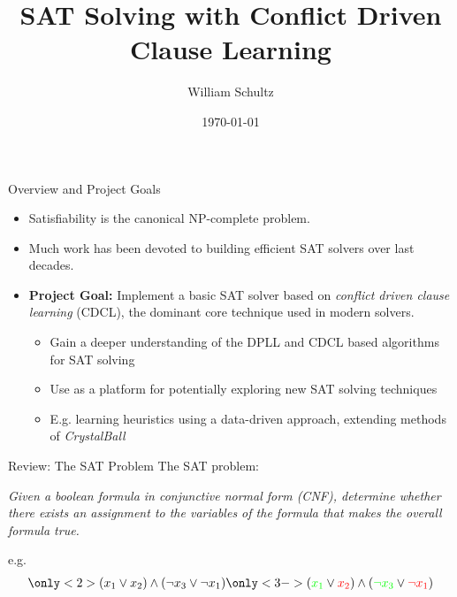 \documentclass{beamer}
\title{SAT Solving with Conflict Driven Clause Learning}
\author{William Schultz}
\institute{CS 7240 Final Project}
\date{\today}
\begin{document}
\newcommand{\green}[1]{\textcolor{green}{#1}}
\newcommand{\red}[1]{\textcolor{red}{#1}}

\begin{frame}
    \titlepage
\end{frame}

\begin{frame}{Overview and Project Goals}
\begin{itemize}
    \item Satisfiability is the canonical NP-complete problem.
    
    \item Much work has been devoted to building efficient SAT solvers over last decades.\\
    
    \item \textbf{Project Goal:} Implement a basic SAT solver based on \textit{conflict driven clause learning} (CDCL), the dominant core technique used in modern solvers.
    \begin{itemize}
        \item Gain a deeper understanding of the DPLL and CDCL based algorithms for SAT solving
        \item Use as a platform for potentially exploring new SAT solving techniques 
        \item E.g. learning heuristics using a data-driven approach, extending methods of \textit{CrystalBall} \cite{2019sooscrystalball}
    \end{itemize}
\end{itemize}
\end{frame}

\begin{frame}{Review: The SAT Problem}
    The SAT problem:
    \vspace{12pt}

    \textit{Given a boolean formula in conjunctive normal form (CNF), determine whether there exists an assignment to the variables of the formula that makes the overall formula true.}

    \pause
    \vspace{12pt}
    e.g.
    \begin{align*}
        \only<2>{
        (x_1 \vee x_2) \wedge (\neg x_3 \vee \neg x_1)
        }
        \only<3->{
            (\green{x_1} \vee \red{x_2}) \wedge (\green{\neg x_3} \vee \red{\neg x_1})
        }
    \end{align*}
\end{frame}
\end{document}
